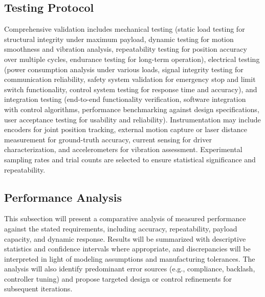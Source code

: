 \subsection{Testing Protocol}
Comprehensive validation includes mechanical testing (static load testing for structural integrity under maximum payload, dynamic testing for motion smoothness and vibration analysis, repeatability testing for position accuracy over multiple cycles, endurance testing for long-term operation), electrical testing (power consumption analysis under various loads, signal integrity testing for communication reliability, safety system validation for emergency stop and limit switch functionality, control system testing for response time and accuracy), and integration testing (end-to-end functionality verification, software integration with control algorithms, performance benchmarking against design specifications, user acceptance testing for usability and reliability). Instrumentation may include encoders for joint position tracking, external motion capture or laser distance measurement for ground-truth accuracy, current sensing for driver characterization, and accelerometers for vibration assessment. Experimental sampling rates and trial counts are selected to ensure statistical significance and repeatability.

\subsection{Performance Analysis}
This subsection will present a comparative analysis of measured performance against the stated requirements, including accuracy, repeatability, payload capacity, and dynamic response. Results will be summarized with descriptive statistics and confidence intervals where appropriate, and discrepancies will be interpreted in light of modeling assumptions and manufacturing tolerances. The analysis will also identify predominant error sources (e.g., compliance, backlash, controller tuning) and propose targeted design or control refinements for subsequent iterations.

